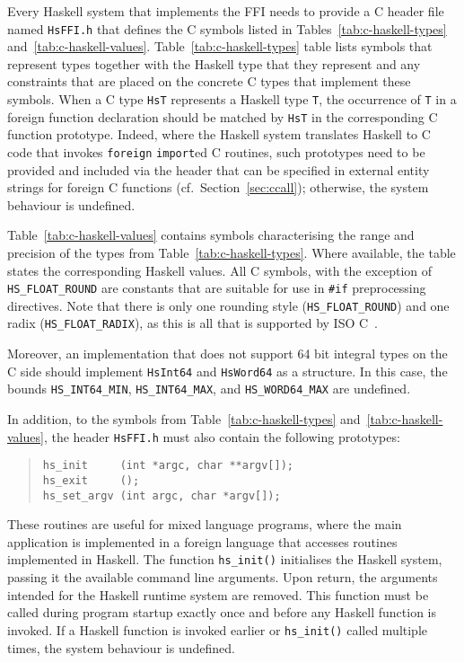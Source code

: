 \documentclass[a4paper,twoside]{article}
\newcommand{\code}[1]{\texttt{#1}}      %
\begin{document}
%
Every Haskell system that implements the FFI needs to provide a C header file
named \code{HsFFI.h} that defines the C symbols listed in
Tables~\ref{tab:c-haskell-types} and~\ref{tab:c-haskell-values}.
Table~\ref{tab:c-haskell-types} table lists symbols that represent types
together with the Haskell type that they represent and any constraints that
are placed on the concrete C types that implement these symbols.  When a C
type \code{HsT} represents a Haskell type \code{T}, the occurrence of \code{T}
in a foreign function declaration should be matched by \code{HsT} in the
corresponding C function prototype.  Indeed, where the Haskell system
translates Haskell to C code that invokes \code{foreign} \code{import}ed C
routines, such prototypes need to be provided and included via the header that
can be specified in external entity strings for foreign C functions (cf.\ 
Section~\ref{sec:ccall}); otherwise, the system behaviour is undefined.

Table~\ref{tab:c-haskell-values} contains symbols characterising the range and
precision of the types from Table~\ref{tab:c-haskell-types}.  Where available,
the table states the corresponding Haskell values.  All C symbols, with the
exception of \code{HS\_FLOAT\_ROUND} are constants that are suitable for use in
\code{\#if} preprocessing directives.  Note that there is only one rounding
style (\code{HS\_FLOAT\_ROUND}) and one radix (\code{HS\_FLOAT\_RADIX}), as
this is all that is supported by ISO C~\cite{C99}.

Moreover, an implementation that does not support 64 bit integral types on the
C side should implement \code{HsInt64} and \code{HsWord64} as a structure.  In
this case, the bounds \code{HS\_INT64\_MIN}, \code{HS\_INT64\_MAX}, and
\code{HS\_WORD64\_MAX} are undefined.

In addition, to the symbols from Table~\ref{tab:c-haskell-types}
and~\ref{tab:c-haskell-values}, the header \code{HsFFI.h} must also contain
the following prototypes:
%
\begin{quote}
\begin{verbatim}
hs_init     (int *argc, char **argv[]);
hs_exit     ();
hs_set_argv (int argc, char *argv[]);
\end{verbatim}
\end{quote}
%
These routines are useful for mixed language programs, where the main
application is implemented in a foreign language that accesses routines
implemented in Haskell.  The function \code{hs\_init()} initialises the
Haskell system, passing it the available command line arguments.  Upon return,
the arguments intended for the Haskell runtime system are removed.  This
function must be called during program startup exactly once and before any
Haskell function is invoked.  If a Haskell function is invoked earlier or
\code{hs\_init()} called multiple times, the system behaviour is undefined.
\end{document}
